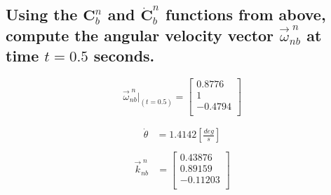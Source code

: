 \documentclass[12pt,letterpaper, onecolumn]{exam}
\begin{document}
\begin{questions}
\begin{parts}
        \part{Using the $\mathbf{C}^n_b$ and $\dot{\mathbf{C}}^n_b$ functions from above, compute the angular velocity vector $\vec{\omega}^{\;n}_{nb}$ at time $t = 0.5$ seconds.}
        \[\vec{\omega}^{\;n}_{nb}\vert_{(t = 0.5)}  =
            \begin{bmatrix}
                0.8776  \\
                1       \\
                -0.4794 \\
            \end{bmatrix} \]
        \begin{subparts}
            \begin{equation}
                \begin{split}
                    \dot{\theta} & = 1.4142\left[\frac{deg}{s}\right] \\
                \end{split}
            \end{equation}
            \begin{equation}
                \begin{split}
                    \vec{k}^{\;n}_{nb} & =
                    \begin{bmatrix}
                        0.43876        \\
                        0.89159        \\
                        -      0.11203 \\
                    \end{bmatrix}
                \end{split}
            \end{equation}
        \end{subparts}
        \clearpage

\end{parts}
\end{questions}
\end{document}
